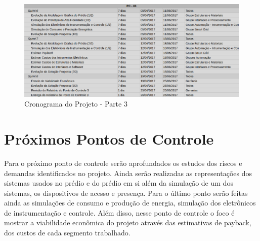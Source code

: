 \begin{figure}[!h]
 \centering	\includegraphics[keepaspectratio=true,scale=0.45]{figuras/c3.eps}
 \caption{Cronograma do Projeto - Parte 3}
 \label{fig022}
\end{figure}

\section{Próximos Pontos de Controle}

Para o próximo ponto de controle serão aprofundados os estudos dos riscos e demandas identificados no projeto. Ainda serão realizadas as representações dos sistemas usados no prédio e do prédio em si além da simulação de um dos sistemas, os dispositivos de acesso e presença.
 Para o último ponto serão feitas ainda as simulações de consumo e produção de energia, simulação dos eletrônicos de instrumentação e controle. Além disso, nesse ponto de controle o foco é mostrar a viabilidade econômica do projeto através das estimativas de payback, dos custos de cada segmento trabalhado.
